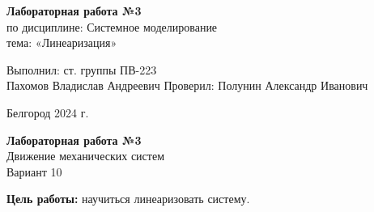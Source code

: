 \documentclass[a4paper,14pt]{extarticle}
\newcommand\textbox[1]{
	\parbox{.45\textwidth}{#1}
}
\begin{document}
\vfill
\begin{center}
    \large{
        \textbf{
            Лабораторная работа №3}}\\
    \normalsize{
        по дисциплине: Системное моделирование \\
        тема: «Линеаризация»}
\end{center}
\vfill
\hfill\textbox{
    Выполнил: ст. группы ПВ-223\\Пахомов Владислав Андреевич
    \bigbreak
    Проверил: Полунин Александр Иванович
}
\vfill\begin{center}
    Белгород 2024 г.
\end{center}
\newpage
\begin{center}
    \textbf{Лабораторная работа №3}\\
    Движение механических систем\\
    Вариант 10
\end{center}
\textbf{Цель работы: }научиться линеаризовать систему.
\end{document}
